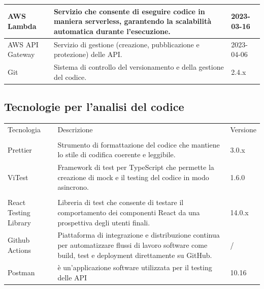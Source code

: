 \documentclass{article}
\begin{document}
\begin{center}
\begin{tabular}{|P{8em}|P{18em}|P{5em}|}
\hline
{}
AWS Lambda & Servizio che consente di eseguire codice in maniera serverless, garantendo la scalabilità automatica durante l'esecuzione. & 2023-03-16 \\
\hline
{}
AWS API Gateway & Servizio di gestione (creazione, pubblicazione e protezione) delle API. & 2023-04-06\\
\hline
{}
Git & Sistema di controllo del versionamento e della gestione del codice. & 2.4.x\\
\hline
\end{tabular}
\label{tab:teccod}
\end{center}


\subsection{Tecnologie per l'analisi del codice}
\begin{center}
\begin{tabular}{|P{8em}|P{18em}|P{5em}|}
\hline
{}
Tecnologia & Descrizione & Versione \\
\hline
{} \\
\hline
{}
Prettier & Strumento di formattazione del codice che mantiene lo stile di
codifica coerente e leggibile. & 3.0.x \\
\hline
{}
ViTest & Framework di test per TypeScript che permette la creazione di mock e il testing del codice in modo asincrono. & 1.6.0\\ 
\hline
{} \\
\hline
{}
React Testing Library & Libreria di test che consente di testare il comportamento dei componenti React da una prospettiva degli utenti finali. & 14.0.x \\
\hline
{}
Github Actions & Piattaforma di integrazione e distribuzione continua per automatizzare flussi di lavoro software come build, test e deployment direttamente su GitHub. & / \\
Postman & è un'applicazione software utilizzata per il testing delle API & 10.16\\
\hline
\end{tabular}
\end{center}
\end{document}
